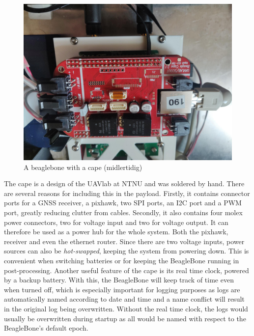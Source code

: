     \begin{figure}
        \centering
        \includegraphics[scale=0.1]{Implementation/Images/BBB.jpg}
        \caption{A beaglebone with a cape (midlertidig)}
        \label{fig:bbb}
    \end{figure}
    
    The cape is a design of the UAVlab at NTNU and was soldered by hand. There are several reasons for including this in the payload. Firstly, it contains connector ports for a GNSS receiver, a pixhawk, two SPI ports, an I2C port and a PWM port, greatly reducing clutter from cables. Secondly, it also contains four molex power connectors, two for voltage input and two for voltage output. It can therefore be used as a power hub for the whole system. Both the pixhawk, receiver and even the ethernet router. Since there are two voltage inputs, power sources can also be \textit{hot-swapped}, keeping the system from powering down. This is convenient when switching batteries or for keeping the BeagleBone running in post-processing. Another useful feature of the cape is its real time clock, powered by a backup battery. With this, the BeagleBone will keep track of time even when turned off, which is especially important for logging purposes as logs are automatically named according to date and time and a name conflict will result in the original log being overwritten. Without the real time clock, the logs would usually be overwritten during startup as all would be named with respect to the BeagleBone's default epoch.\\
    
